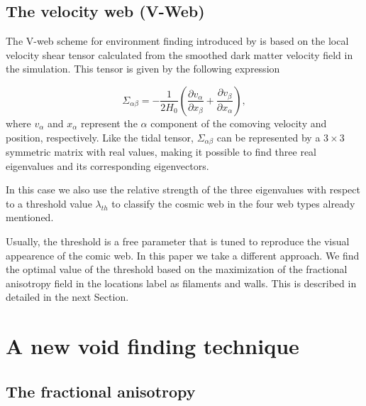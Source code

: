 \documentclass[a4,useAMS,usenatbib,usegraphicx]{mn2e}
\newcommand{\pr}[1]{ \left( #1 \right) }
\newcommand{\eq}[2]{\begin{equation} \label{eq:#1} #2 \end{equation}}
\begin{document}
\subsection{The velocity web (V-Web)}
\label{subsec:Vweb}

The V-web scheme for environment finding introduced by
\cite{Hoffman12} is based on the local velocity shear tensor
calculated from the smoothed dark matter  velocity field in the
simulation. 
This tensor is given by the  following expression

\eq{V_web}
{	\Sigma_{\alpha\beta} = -\frac{1}{2H_0}\pr{\frac{\partial v_{\alpha}}
{\partial x_{\beta}}+\frac{\partial v_{\beta}}{\partial x_{\alpha}}},}
where $v_{\alpha}$ and $x_{\alpha}$ represent the $\alpha$ component of 
the comoving velocity and position, respectively. Like the tidal tensor, 
$\Sigma_{\alpha\beta}$ can be represented by a $3\times 3$ symmetric 
matrix with real values, making it possible to find three real
eigenvalues and its corresponding eigenvectors.

In this case we also use the relative strength of the three eigenvalues with 
respect to a threshold value $\lambda_{th}$ to classify the cosmic web
in the four web types already mentioned.

Usually, the threshold is a free parameter that is tuned to reproduce
the visual appearence of the comic web. 
In this paper we take a different approach.
We find the optimal value of the threshold based on the maximization
of the fractional anisotropy field in the locations label as filaments
and walls. 
This is described in detailed in the next Section.



\section{A new void finding technique}
\label{sec:bulk_voids}


\subsection{The fractional anisotropy}
\label{subsec:FA_voids}
\end{document}
